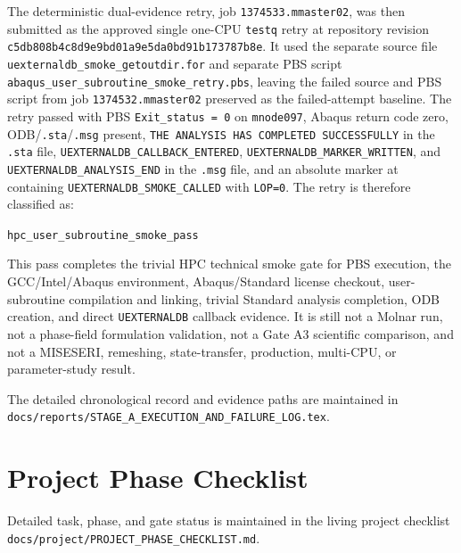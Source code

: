 \documentclass[11pt,a4paper]{article}
\begin{document}
The deterministic dual-evidence retry, job \texttt{1374533.mmaster02}, was then submitted as the approved single one-CPU \texttt{testq} retry at repository revision \texttt{c5db808b4c8d9e9bd01a9e5da0bd91b173787b8e}. It used the separate source file \texttt{uexternaldb\_smoke\_getoutdir.for} and separate PBS script \texttt{abaqus\_user\_subroutine\_smoke\_retry.pbs}, leaving the failed source and PBS script from job \texttt{1374532.mmaster02} preserved as the failed-attempt baseline. The retry passed with PBS \texttt{Exit\_status = 0} on \texttt{mnode097}, Abaqus return code zero, ODB/\texttt{.sta}/\texttt{.msg} present, \texttt{THE ANALYSIS HAS COMPLETED SUCCESSFULLY} in the \texttt{.sta} file, \texttt{UEXTERNALDB\_CALLBACK\_ENTERED}, \texttt{UEXTERNALDB\_MARKER\_WRITTEN}, and \texttt{UEXTERNALDB\_ANALYSIS\_END} in the \texttt{.msg} file, and an absolute marker at  containing \texttt{UEXTERNALDB\_SMOKE\_CALLED} with \texttt{LOP=0}. The retry is therefore classified as:

\begin{center}
\texttt{hpc\_user\_subroutine\_smoke\_pass}
\end{center}

This pass completes the trivial HPC technical smoke gate for PBS execution, the GCC/Intel/Abaqus environment, Abaqus/Standard license checkout, user-subroutine compilation and linking, trivial Standard analysis completion, ODB creation, and direct \texttt{UEXTERNALDB} callback evidence. It is still not a Molnar run, not a phase-field formulation validation, not a Gate A3 scientific comparison, and not a MISESERI, remeshing, state-transfer, production, multi-CPU, or parameter-study result.

The detailed chronological record and evidence paths are maintained in \texttt{docs/reports/STAGE\_A\_EXECUTION\_AND\_FAILURE\_LOG.tex}.

\section{Project Phase Checklist}

Detailed task, phase, and gate status is maintained in the living project checklist \texttt{docs/project/PROJECT\_PHASE\_CHECKLIST.md}.
\end{document}
